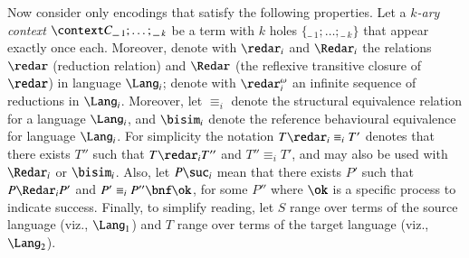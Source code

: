 \documentclass{llncs}
\begin{document}
Now consider only encodings that satisfy the following properties.
Let a {\em $k$-ary context} $\context C {\_\,_1; \ldots; \_\,_k}$ be a term with $k$
holes $\{\_\,_1;\ldots;\_\,_k\}$ that appear exactly once each.
Moreover, denote with $\redar_i$ and $\Redar_i$ 
the relations $\redar$ (reduction relation) and
$\Redar$ (the reflexive transitive closure of $\redar$) in language $\Lang_i$;
denote with $\redar^\omega_i$ an infinite sequence of reductions in $\Lang_i$.
Moreover,
let $\equiv_i$ denote the structural equivalence relation for a language $\Lang_i$, and
$\bisim_i$ denote the reference behavioural equivalence for language $\Lang_i$.
For simplicity the notation $T \redar_i \equiv_i T'$ denotes that there exists $T''$
such that $T\redar_i T''$ and $T''\equiv_i T'$, and may also be used with $\Redar_i$
or $\bisim_i$. Also, let $P \suc_i$ mean that there exists $P'$ such that $P \Redar_i P'$ and $P' \equiv_i P''\bnf \ok$,
for some $P''$ where $\ok$ is a specific process to indicate success.
Finally, to simplify reading, let $S$ range
over terms of the source language (viz., $\Lang_1$) and $T$ range
over terms of the target language (viz., $\Lang_2$).
\end{document}
